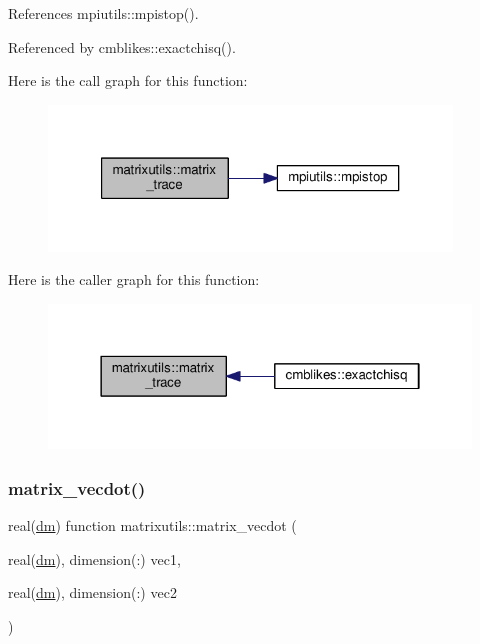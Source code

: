 References mpiutils\+::mpistop().



Referenced by cmblikes\+::exactchisq().

Here is the call graph for this function\+:
\nopagebreak
\begin{figure}[H]
\begin{center}
\leavevmode
\includegraphics[width=304pt]{namespacematrixutils_aba34e30d438cd387bb0f57e16d60b364_cgraph}
\end{center}
\end{figure}
Here is the caller graph for this function\+:
\nopagebreak
\begin{figure}[H]
\begin{center}
\leavevmode
\includegraphics[width=322pt]{namespacematrixutils_aba34e30d438cd387bb0f57e16d60b364_icgraph}
\end{center}
\end{figure}
\mbox{\label{namespacematrixutils_a14ec6bb3e63d084752f528c47653f7d7}} 
\subsubsection{\texorpdfstring{matrix\+\_\+vecdot()}{matrix\_vecdot()}}
{\footnotesize\ttfamily real(\mbox{\hyperlink{namespacematrixutils_a7bdc564986ea4d90f51201c75606ef3d}{dm}}) function matrixutils\+::matrix\+\_\+vecdot (\begin{DoxyParamCaption}\item[{real(\mbox{\hyperlink{namespacematrixutils_a7bdc564986ea4d90f51201c75606ef3d}{dm}}), dimension(\+:)}]{vec1,  }\item[{real(\mbox{\hyperlink{namespacematrixutils_a7bdc564986ea4d90f51201c75606ef3d}{dm}}), dimension(\+:)}]{vec2 }\end{DoxyParamCaption})}



